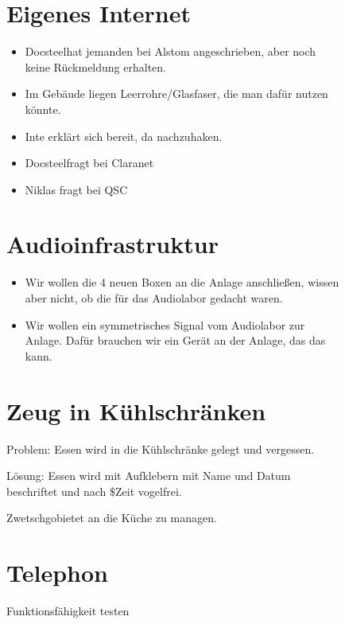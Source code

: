 \documentclass[parskip]{scrartcl}
\newcommand\docsteel{Docsteel}
\newcommand\zwetschgo{Zwetschgo}
\begin{document}
\begin{figure}
\section{Eigenes Internet}

\begin{itemize}
\item{} \docsteel hat jemanden bei Alstom angeschrieben, aber noch keine Rückmeldung erhalten.
\item{} Im Gebäude liegen Leerrohre/Glasfaser, die man dafür nutzen könnte.
\item{} Inte erklärt sich bereit, da nachzuhaken.
\item{} \docsteel fragt bei Claranet
\item{} Niklas fragt bei QSC
\end{itemize}

\end{figure}
\begin{figure}
\section{Audioinfrastruktur}

\begin{itemize}
\item{} Wir wollen die 4 neuen Boxen an die Anlage anschließen, wissen aber nicht, ob die für das Audiolabor gedacht waren.
\item{} Wir wollen ein symmetrisches Signal vom Audiolabor zur Anlage. Dafür brauchen wir ein Gerät an der Anlage, das das kann.
\end{itemize}

\end{figure}
\begin{figure}
\section{Zeug in Kühlschränken}

Problem: Essen wird in die Kühlschränke gelegt und vergessen.

Lösung: Essen wird mit Aufklebern mit Name und Datum beschriftet und nach \$Zeit vogelfrei.

\zwetschgo bietet an die Küche zu managen.

\end{figure}
\begin{figure}
\section{Telephon}

Funktionsfähigkeit testen
\end{figure}
\end{document}
